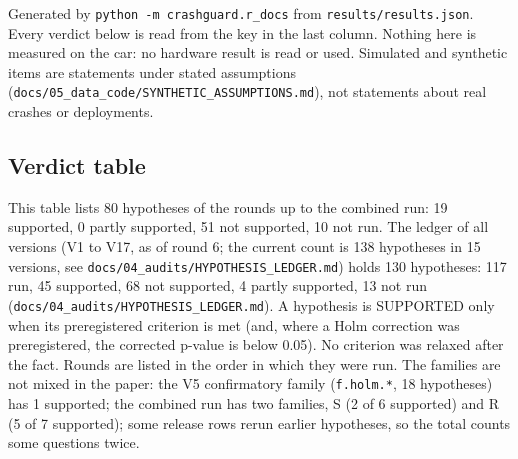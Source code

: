 


Generated by \texttt{python -m crashguard.r\_docs} from \texttt{results/results.json}. Every verdict below is read from the key in the last column. Nothing here is measured on the car: no hardware result is read or used. Simulated and synthetic items are statements under stated assumptions (\texttt{docs/05\_data\_code/SYNTHETIC\_ASSUMPTIONS.md}), not statements about real crashes or deployments.

\subsection*{Verdict table}

This table lists 80 hypotheses of the rounds up to the combined run: 19 supported, 0 partly supported, 51 not supported, 10 not run. The ledger of all versions (V1 to V17, as of round 6; the current count is 138 hypotheses in 15 versions, see \texttt{docs/04\_audits/HYPOTHESIS\_LEDGER.md}) holds 130 hypotheses: 117 run, 45 supported, 68 not supported, 4 partly supported, 13 not run (\texttt{docs/04\_audits/HYPOTHESIS\_LEDGER.md}). A hypothesis is SUPPORTED only when its preregistered criterion is met (and, where a Holm correction was preregistered, the corrected p-value is below 0.05). No criterion was relaxed after the fact. Rounds are listed in the order in which they were run. The families are not mixed in the paper: the V5 confirmatory family (\texttt{f.holm.*}, 18 hypotheses) has 1 supported; the combined run has two families, S (2 of 6 supported) and R (5 of 7 supported); some release rows rerun earlier hypotheses, so the total counts some questions twice.

